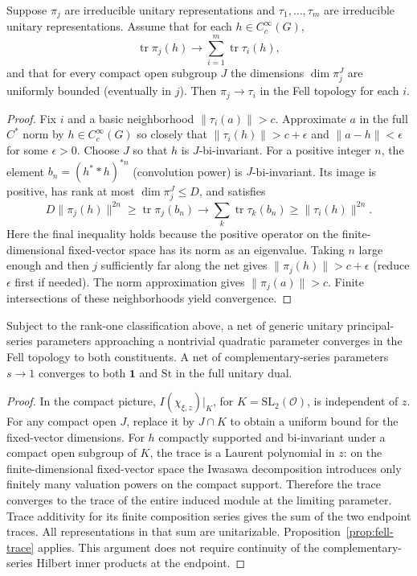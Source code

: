 \begin{proposition}\label{prop:fell-trace}
Suppose $\pi_j$ are irreducible unitary representations and $\tau_1,\ldots,\tau_m$ are irreducible unitary representations. Assume that for each $h\in C_c^\infty(G)$,
\[\operatorname{tr}\pi_j(h)\longrightarrow\sum_{i=1}^m\operatorname{tr}\tau_i(h),\]
and that for every compact open subgroup $J$ the dimensions $\dim\pi_j^J$ are uniformly bounded (eventually in $j$). Then $\pi_j\to\tau_i$ in the Fell topology for each $i$.
\end{proposition}
\begin{proof}
Fix $i$ and a basic neighborhood $\|\tau_i(a)\|>c$. Approximate $a$ in the full $C^*$ norm by $h\in C_c^\infty(G)$ so closely that $\|\tau_i(h)\|>c+\epsilon$ and $\|a-h\|<\epsilon$ for some $\epsilon>0$. Choose $J$ so that $h$ is $J$-bi-invariant. For a positive integer $n$, the element $b_n=(h^**h)^{*n}$ (convolution power) is $J$-bi-invariant. Its image is positive, has rank at most $\dim\pi_j^J\le D$, and satisfies
\[D\|\pi_j(h)\|^{2n}\ge\operatorname{tr}\pi_j(b_n)\longrightarrow\sum_k\operatorname{tr}\tau_k(b_n)\ge\|\tau_i(h)\|^{2n}.\]
Here the final inequality holds because the positive operator on the finite-dimensional fixed-vector space has its norm as an eigenvalue. Taking $n$ large enough and then $j$ sufficiently far along the net gives $\|\pi_j(h)\|>c+\epsilon$ (reduce $\epsilon$ first if needed). The norm approximation gives $\|\pi_j(a)\|>c$. Finite intersections of these neighborhoods yield convergence.
\end{proof}

\begin{proposition}\label{prop:endpoint-limits}
Subject to the rank-one classification above, a net of generic unitary principal-series parameters approaching a nontrivial quadratic parameter converges in the Fell topology to both constituents. A net of complementary-series parameters $s\to1$ converges to both $\mathbf1$ and $\mathrm{St}$ in the full unitary dual.
\end{proposition}
\begin{proof}
In the compact picture, $I(\chi_{\xi,z})|_K$, for $K=\mathrm{SL}_2(\mathcal O)$, is independent of $z$. For any compact open $J$, replace it by $J\cap K$ to obtain a uniform bound for the fixed-vector dimensions. For $h$ compactly supported and bi-invariant under a compact open subgroup of $K$, the trace is a Laurent polynomial in $z$: on the finite-dimensional fixed-vector space the Iwasawa decomposition introduces only finitely many valuation powers on the compact support. Therefore the trace converges to the trace of the entire induced module at the limiting parameter. Trace additivity for its finite composition series gives the sum of the two endpoint traces. All representations in that sum are unitarizable. Proposition~\ref{prop:fell-trace} applies. This argument does not require continuity of the complementary-series Hilbert inner products at the endpoint.
\end{proof}

